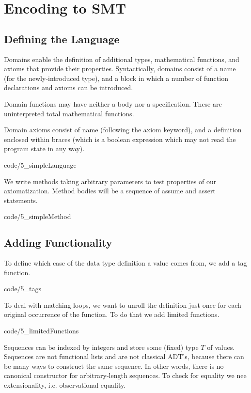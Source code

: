 \section{Encoding to SMT}
\subsection{Defining the Language}
\begin{mytitle}[Domains] Domains enable the definition of additional types, mathematical functions, and axioms that provide their properties. Syntactically, domains consist of a name (for the newly-introduced type), and a block in which a number of function declarations and axioms can be introduced.
\end{mytitle}
\begin{mytitle}[Functions] Domain functions may have neither a body nor a specification. These are uninterpreted total mathematical functions.
\end{mytitle}
\begin{mytitle}[Axioms] Domain axioms consist of name (following the axiom keyword), and a definition enclosed within braces (which is a boolean expression which may not read the program state in any way).
\end{mytitle}
 {code/5_simpleLanguage}
\begin{mytitle}[Methods] We write methods taking arbitrary parameters to test properties of our axiomatization. Method bodies will be a sequence of assume and assert statements. 
\end{mytitle}
 {code/5_simpleMethod}
\subsection{Adding Functionality}
\begin{mytitle}[Tags] To define which case of the data type definition a value comes from, we add a tag function.
\end{mytitle}
 {code/5_tags}
\begin{mytitle} To deal with matching loops, we want to unroll the definition just once for each original occurrence of the function. To do that we add limited functions.
\end{mytitle}
 {code/5_limitedFunctions}
\begin{mytitle}[Sequences] Sequences can be indexed by integers and store some (fixed) type $T$ of values. Sequences are not functional lists and are not classical ADT's, because there can be many ways to construct the same sequence. In other words, there is no canonical constructor for arbitrary-length sequences. To check for equality we nee extensionality, i.e. observational equality.
\end{mytitle}
